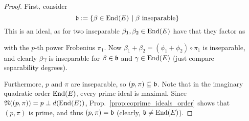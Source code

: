 \begin{proof}
    First, consider
    \begin{equation*}
        \mathfrak{b} := \{ \beta \in \mathrm{End}(E) \ | \ \text{$\beta$ inseparable} \}
    \end{equation*}
    This is an ideal, as for two inseparable $\beta_1, \beta_2 \in \mathrm{End}(E)$ have that they factor as
    \begin{center}
    \end{center}
    with the $p$-th power Frobenius $\pi_1$.
    Now $\beta_1 + \beta_2 = (\phi_1 + \phi_2) \circ \pi_1$ is inseparable, and clearly $\beta \gamma$ is inseparable for $\beta \in \mathfrak{b}$ and $\gamma \in \mathrm{End}(E)$ (just compare separability degrees).

    Furthermore, $p$ and $\pi$ are inseparable, so $(p, \pi) \subseteq \mathfrak{b}$.
    Note that in the imaginary quadratic order $\mathrm{End}(E)$, every prime ideal is maximal.
    Since $\mathfrak{N}((p, \pi)) = p \perp d(\mathrm{End}(E))$, Prop.~\ref{prop:coprime_ideals_order} shows that $(p, \pi)$ is prime, and thus $(p, \pi) = \mathfrak{b}$ (clearly, $\mathfrak{b} \neq \mathrm{End}(E)$).
\end{proof}

